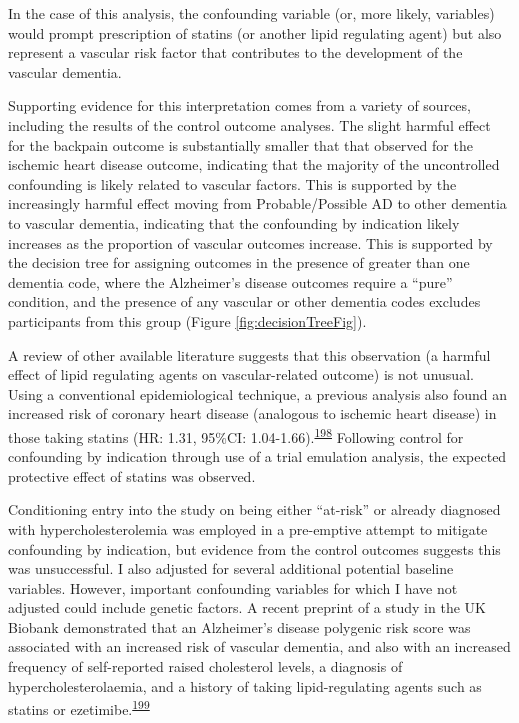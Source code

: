 \documentclass[a4paper, twoside]{templates/ociamthesis}
\begin{document}
In the case of this analysis, the confounding variable (or, more likely, variables) would prompt prescription of statins (or another lipid regulating agent) but also represent a vascular risk factor that contributes to the development of the vascular dementia.

Supporting evidence for this interpretation comes from a variety of sources, including the results of the control outcome analyses. The slight harmful effect for the backpain outcome is substantially smaller that that observed for the ischemic heart disease outcome, indicating that the majority of the uncontrolled confounding is likely related to vascular factors. This is supported by the increasingly harmful effect moving from Probable/Possible AD to other dementia to vascular dementia, indicating that the confounding by indication likely increases as the proportion of vascular outcomes increase. This is supported by the decision tree for assigning outcomes in the presence of greater than one dementia code, where the Alzheimer's disease outcomes require a ``pure'' condition, and the presence of any vascular or other dementia codes excludes participants from this group (Figure \ref{fig:decisionTreeFig}).

A review of other available literature suggests that this observation (a harmful effect of lipid regulating agents on vascular-related outcome) is not unusual. Using a conventional epidemiological technique, a previous analysis also found an increased risk of coronary heart disease (analogous to ischemic heart disease) in those taking statins (HR: 1.31, 95\%CI: 1.04-1.66).\textsuperscript{\protect\hyperlink{ref-danaei2013b}{198}} Following control for confounding by indication through use of a trial emulation analysis, the expected protective effect of statins was observed.

Conditioning entry into the study on being either ``at-risk'' or already diagnosed with hypercholesterolemia was employed in a pre-emptive attempt to mitigate confounding by indication, but evidence from the control outcomes suggests this was unsuccessful. I also adjusted for several additional potential baseline variables. However, important confounding variables for which I have not adjusted could include genetic factors. A recent preprint of a study in the UK Biobank demonstrated that an Alzheimer's disease polygenic risk score was associated with an increased risk of vascular dementia, and also with an increased frequency of self-reported raised cholesterol levels, a diagnosis of hypercholesterolaemia, and a history of taking lipid-regulating agents such as statins or ezetimibe.\textsuperscript{\protect\hyperlink{ref-korologou-linden2020}{199}}
\end{document}
